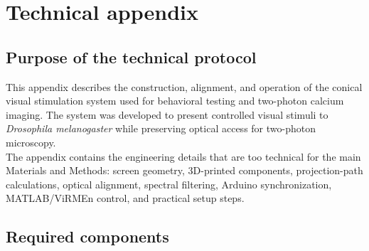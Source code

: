 \appendix

\section{Technical appendix}

\subsection{Purpose of the technical protocol}

This appendix describes the construction, alignment, and operation of the conical visual stimulation system used for behavioral testing and two-photon calcium imaging. The system was developed to present controlled visual stimuli to \textit{Drosophila melanogaster} while preserving optical access for two-photon microscopy.\\

The appendix contains the engineering details that are too technical for the main Materials and Methods: screen geometry, 3D-printed components, projection-path calculations, optical alignment, spectral filtering, Arduino synchronization, MATLAB/ViRMEn control, and practical setup steps.\\

\subsection{Required components}

